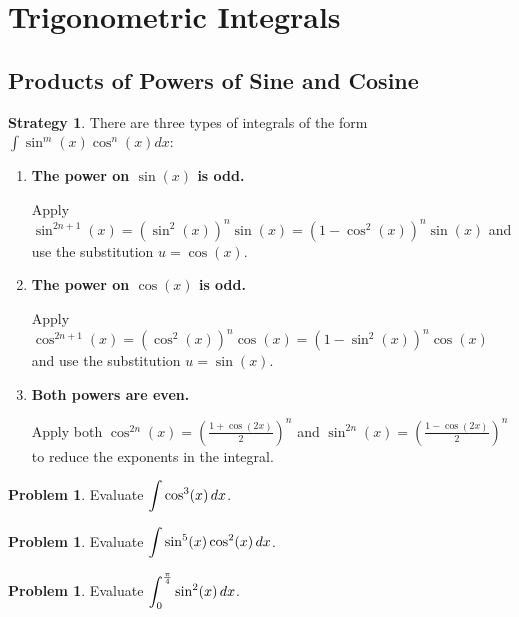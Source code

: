 \documentclass[letterpaper, twoside, 12pt]{book}
\theoremstyle{definition}
\theoremstyle{definition}
\newtheorem{problem}[theorem]{Problem}
\newtheorem{strategy}[theorem]{Strategy}
\newcommand{\ds}{\ensuremath{\displaystyle}}
\begin{document}
\newpage

\section{Trigonometric Integrals}

\subsection{Products of Powers of Sine and Cosine}

\begin{strategy}

  There are three types of integrals of the form $\int \sin^m(x) \cos^n(x) dx$:

  \begin{enumerate}
  \renewcommand{\theenumi}{\Roman{enumi}}
  \item \textbf{The power on $\sin(x)$ is odd.}

    Apply $\sin^{2n+1}(x)=(\sin^2(x))^n\sin(x)=(1-\cos^2(x))^n\sin(x)$
    and use the substitution $u=\cos(x)$.

  \item \textbf{The power on $\cos(x)$ is odd.}

    Apply $\cos^{2n+1}(x)=(\cos^2(x))^n\cos(x)=(1-\sin^2(x))^n\cos(x)$
    and use the substitution $u=\sin(x)$.

  \item \textbf{Both powers are even.}

    Apply both $\cos^{2n}(x)=\left(\frac{1+\cos(2x)}{2}\right)^n$ and
    $\sin^{2n}(x)=\left(\frac{1-\cos(2x)}{2}\right)^n$ to reduce the exponents
    in the integral.
  \end{enumerate}

\end{strategy}

\begin{problem}
 Evaluate $\ds \int \cos^3(x) \, dx$.
\end{problem}

\vfill

\begin{problem}
 Evaluate $\ds \int \sin^5(x)\cos^2(x) \, dx$.
\end{problem}

\vfill

\newpage

\begin{problem}
 Evaluate $\ds \int_0^{\frac{\pi}{4}} \sin^2(x) \, dx$.
\end{problem}
\end{document}
